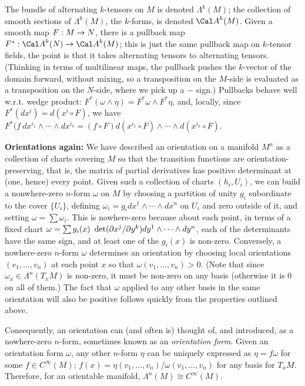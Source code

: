 The bundle of alternating $k$-tensors on $M$ is denoted $\Lambda^k(M)$; the collection of smooth sections
of $\Lambda^k(M)$, the $k$-forms, is denoted ${\Cal A}^k(M)$. Given a smooth map $F:M\rightarrow N$,
there is a pullback map $F^*:{\Cal A}^k(N)\ra {\Cal A}^k(M)$; this is just the same pullback map on
$k$-tensor fields, the point is that it takes alternating tensors to alternating tensors. (Thinking
in terms of multilinear maps, the pullback pushes the $k$-vector of the domain forward, without
mixing, so a transposition on the $M$-side is evaluated as a transposition on the $N$-side, where
we pick up a $-$ sign.) Pullbacks behave well w.r.t. wedge product: 
$F^*(\omega\wedge\eta)=F^*\omega\wedge F^*\eta$, and, locally, since $F^*(dx^i)=d(x^i\circ F)$,
we have $F^*(f\ dx^{i_1}\wedge\cdots \wedge dx^{i_k}=(f\circ F)d(x^{i_1}\circ F)\wedge\cdots\wedge d(x^{i_k}\circ F)$.

\msk

{\bf Orientations again:} We have described an orientation on a manifold $M^n$ as a collection of charts covering
$M$ so that the transition functions are orientation-preserving, that is, the matrix of partial derivatives
has positive determinant at (one, hence) every point. Given such a collection of charts $(h_i,U_i)$, we can build
a nonwhere-zero $n$-form $\omega$ on $M$ by choosing a partition of unity $g_i$ subordinate to the cover $\{U_i\}$,
defining $\omega_i=g_i dx^1\wedge\cdots\wedge dx^n$ on $U_i$ and zero outside of it, and setting $\omega=\sum \omega_i$.
This is nowhere-zero because about each point, in terms of a fixed chart 
$\omega =\sum g_i(x)\ \det(\partial x^j/\partial y^k) dy^1\wedge\cdots\wedge dy^n$, each of the determinants have the
same sign, and at least one of the $g_i(x)$ is non-zero.
Conversely, a nowhere-zero $n$-form $\omega$ determines an orientation by choosing local orientations
$(v_1,\ldots,v_n)$ at each point $x$ so that $\omega(v_1,\ldots,v_n)>0$. (Note that since $\omega_x\in \Lambda^n(T_xM)$
is non-zero, it must be non-zero on any basis (otherwise it is $0$ on all of them.) The fact that $\omega$ applied to
any other basis in the same orientation will also be positive follows quickly from the properties outlined above.

Consequently, an orientation can (and often is) thought of, and introduced, as a nowhere-zero $n$-form, 
sometimes known as an {\it orientation form}. Given an orientation form $\omega$, any other $n$-form $\eta$ can be
uniquely expressed as $\eta=f\omega$ for some $f\in C^\infty(M)$; $f(x)=\eta(v_1,\ldots ,v_n)/\omega(v_1,\ldots,v_n)$
for any basis for $T_xM$. Therefore, for an orientable manifold, $\Lambda^n(M)\cong C^\infty(M)$.

